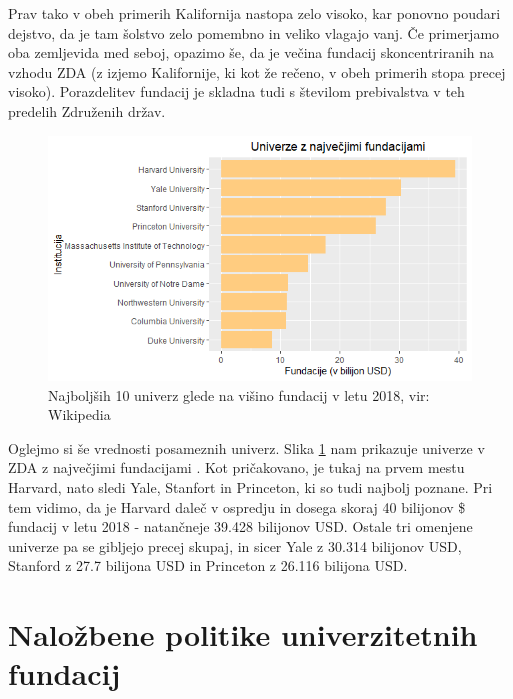 \documentclass[12pt, a4paper]{article}
\begin{document}
Prav tako v obeh primerih Kalifornija nastopa zelo visoko, kar ponovno poudari dejstvo, da je tam šolstvo zelo pomembno in veliko vlagajo vanj. Če primerjamo oba zemljevida med seboj, opazimo še, da je večina fundacij skoncentriranih na vzhodu ZDA (z izjemo Kalifornije, ki kot že rečeno, v obeh primerih stopa precej visoko). Porazdelitev fundacij je skladna tudi s številom prebivalstva v teh predelih Združenih držav.\\

\begin{figure}[!h]
\centering
\includegraphics[width = 15 cm]{grafi_zemljevidi/top10.png}
\caption{Najboljših 10 univerz glede na višino fundacij v letu 2018, vir: Wikipedia}
\label{Slika 3}
\end{figure}

Oglejmo si še vrednosti posameznih univerz. Slika \ref{Slika 3} nam prikazuje univerze v ZDA z največjimi fundacijami \cite{wiki}. Kot pričakovano, je tukaj na prvem mestu Harvard, nato sledi Yale, Stanfort in Princeton, ki so tudi najbolj poznane. Pri tem vidimo, da je Harvard daleč v ospredju in dosega skoraj 40 bilijonov \$ fundacij v letu 2018 - natančneje 39.428 bilijonov USD. Ostale tri omenjene univerze pa se gibljejo precej skupaj, in sicer Yale z 30.314
bilijonov USD, Stanford z 27.7 bilijona USD in Princeton z 26.116 bilijona USD.



\section[Naložbene politike univerzitetnih fundacij]{Naložbene politike univerzitetnih fundacij}
\end{document}
